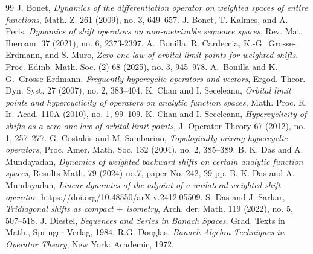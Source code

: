\documentclass[12pt, reqno]{amsart}
\theoremstyle{definition}
\theoremstyle{remark}
\numberwithin{equation}{section}
\begin{document}
\begin{thebibliography}{99}
 J. Bonet, \textit{Dynamics of the differentiation operator on weighted spaces of entire functions}, Math. Z. 261 (2009), no. 3, 649–657.
 J. Bonet, T. Kalmes, and A. Peris, \textit{Dynamics of shift operators on non-metrizable sequence spaces}, Rev. Mat. Iberoam. 37 (2021), no. 6, 2373-2397.
 A.\ Bonilla, R. Cardeccia, K.-G.\ Grosse-Erdmann, and S. Muro, \textit{Zero-one law of orbital limit points for weighted shifts}, Proc. Edinb. Math. Soc. (2) 68 (2025), no. 3, 945–978.
 A.\ Bonilla and K.-G.\ Grosse-Erdmann,
\textit{Frequently hypercyclic operators and vectors}, Ergod. Theor. Dyn. Syst. 27 (2007), no. 2, 383–404.
 K. Chan and I. Seceleanu, \textit{Orbital limit points and hypercyclicity of operators on analytic function spaces}, Math. Proc. R. Ir. Acad. 110A (2010), no. 1, 99–109.
 K. Chan and I. Seceleanu, \textit{Hypercyclicity of shifts as a zero-one law of orbital limit points}, J. Operator Theory 67 (2012), no. 1, 257–277.
 G. Costakis and M. Sambarino, \textit{Topologically mixing hypercyclic operators}, Proc. Amer. Math. Soc. 132 (2004), no. 2, 385–389. 
 B. K. Das and A. Mundayadan, \textit{Dynamics of weighted backward shifts on certain analytic function spaces}, Results Math. 79 (2024) no.7, paper No. 242, 29 pp.
 B. K. Das and A. Mundayadan,  \textit{Linear dynamics of the adjoint of a unilateral weighted shift operator,} https://doi.org/10.48550/arXiv.2412.05509.
 S. Das and J. Sarkar, \textit{Tridiagonal shifts as compact $+$ isometry}, Arch. der. Math. 119 (2022), no. 5, 507–518. 
 J. Diestel, \textit{Sequences and Series in Banach Spaces}, Grad. Texts in Math., Springer-Verlag, 1984.
 R.G. Douglas, \textit{Banach Algebra Techniques in Operator Theory}, New York: Academic, 1972.


\end{thebibliography}
\end{document}
